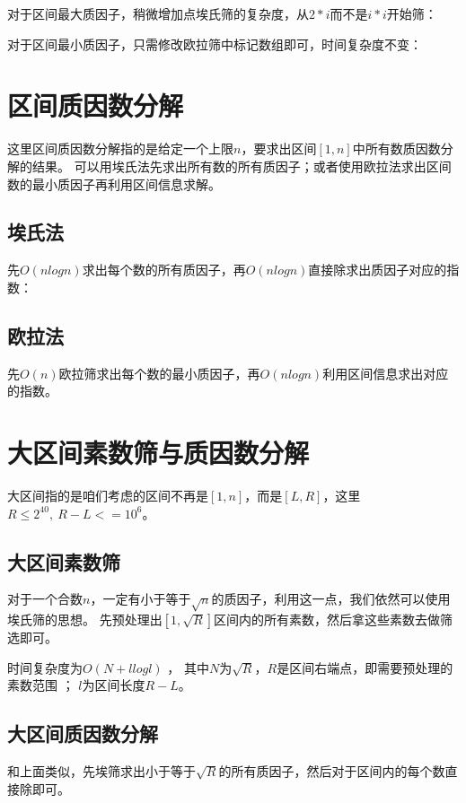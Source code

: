 对于区间最大质因子，稍微增加点埃氏筛的复杂度，从$2*i$而不是$i*i$开始筛：



对于区间最小质因子，只需修改欧拉筛中标记数组即可，时间复杂度不变：




\section{区间质因数分解}
这里区间质因数分解指的是给定一个上限$n$，要求出区间$[1,n]$中所有数质因数分解的结果。
可以用埃氏法先求出所有数的所有质因子；或者使用欧拉法求出区间数的最小质因子再利用区间信息求解。
\subsection{埃氏法}
先$O(nlogn)$求出每个数的所有质因子，再$O(nlogn)$直接除求出质因子对应的指数：



\subsection{欧拉法}
先$O(n)$欧拉筛求出每个数的{\heiti 最小质因子}，再$O(nlogn)$利用区间信息求出对应的指数。


\section{大区间素数筛与质因数分解}
大区间指的是咱们考虑的区间不再是$[1,n]$，而是$[L,R]$，这里$R\le 2^{40}, \  R-L<=10^6$。

\subsection{大区间素数筛}
对于一个合数$n$，一定有小于等于$\sqrt{n}$的质因子，利用这一点，我们依然可以使用埃氏筛的思想。
先预处理出$[1,\sqrt{R}]$区间内的所有素数，然后拿这些素数去做筛选即可。

时间复杂度为$O(N + llogl)$ ， 其中$N$为$\sqrt{R}$，$R$是区间右端点，即需要预处理的素数范围 ； $l$为区间长度$R-L$。



\subsection{大区间质因数分解}
和上面类似，先埃筛求出小于等于$\sqrt{R}$的所有质因子，然后对于区间内的每个数直接除即可。

